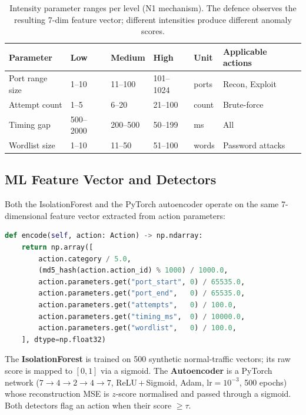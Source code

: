 \documentclass[sigconf]{acmart}
\begin{document}
\begin{table}[t]
\caption{Intensity parameter ranges per level (N1 mechanism). The defence observes
the resulting 7-dim feature vector; different intensities produce different anomaly scores.}
\label{tab:intensity}
\centering
\small
\begin{tabular}{l l l l l l}
\toprule
Parameter & Low & Medium & High & Unit & Applicable actions \\
\midrule
Port range size & 1--10     & 11--100  & 101--1024 & ports & Recon, Exploit \\
Attempt count   & 1--5      & 6--20    & 21--100   & count & Brute-force \\
Timing gap      & 500--2000 & 200--500 & 50--199   & ms    & All \\
Wordlist size   & 1--10     & 11--50   & 51--100   & words & Password attacks \\
\bottomrule
\end{tabular}
\end{table}

\subsection{ML Feature Vector and Detectors}
\label{sec:features}

Both the IsolationForest and the PyTorch autoencoder operate on the same
7-dimensional feature vector extracted from action parameters:

\begin{lstlisting}[language=Python, caption={ActionFeatureEncoder.encode() --- 7-dim normalised feature vector.}]
def encode(self, action: Action) -> np.ndarray:
    return np.array([
        action.category / 5.0,
        (md5_hash(action.action_id) % 1000) / 1000.0,
        action.parameters.get("port_start", 0) / 65535.0,
        action.parameters.get("port_end",   0) / 65535.0,
        action.parameters.get("attempts",   0) / 100.0,
        action.parameters.get("timing_ms",  0) / 10000.0,
        action.parameters.get("wordlist",   0) / 100.0,
    ], dtype=np.float32)
\end{lstlisting}

\noindent
The \textbf{IsolationForest} is trained on 500 synthetic normal-traffic
vectors; its raw score is mapped to $[0,1]$ via a sigmoid. The
\textbf{Autoencoder} is a PyTorch network ($7 \to 4 \to 2 \to 4 \to 7$,
ReLU\,+\,Sigmoid, Adam, $\mathrm{lr} = 10^{-3}$, 500 epochs) whose
reconstruction MSE is $z$-score normalised and passed through a sigmoid.
Both detectors flag an action when their score $\geq \tau$.
\end{document}
